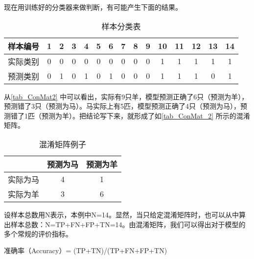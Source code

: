 现在用训练好的分类器来做判断，有可能产生下面的结果。

\begin{table}[ht]
\centering
\caption{样本分类表}\label{tab_ConMat2}
\begin{tabular}{|c|c|c|c|c|c|c|c|c|c|c|c|c|c|c|}
\hline
样本编号 & 1 & 2 & 3 & 4 & 5 & 6 & 7 & 8 & 9 & 10 & 11 & 12 & 13 & 14 \\
\hline
实际类别 & 0 & 0 & 0 & 0 & 0 & 0 & 0 & 0 & 0 & 1 & 1 & 1 & 1 & 1 \\
\hline
预测类别 & 0 & 1 & 0 & 1 & 0 & 1 & 0 & 0 & 0 & 1 & 1 & 1 & 0 & 1 \\
\hline
\end{tabular}
\end{table}

从\autoref{tab_ConMat2} 中可以看出，实际有9只羊，模型预测正确了6只（预测为羊），预测错了3只（预测为马）。马实际上有5匹，模型预测正确了4只（预测为马），预测错了1匹（预测为羊）。把结论写下来，就形成了如\autoref{tab_ConMat_2} 所示的混淆矩阵。
\begin{table}[ht]
\centering
\caption{混淆矩阵例子}\label{tab_ConMat_2}
\begin{tabular}{|c|c|c|}
\hline
 & 预测为马 & 预测为羊 \\
\hline
实际为马 & 4 & 1 \\
\hline
实际为羊 & 3 & 6 \\
\hline
\end{tabular}
\end{table}

设样本总数用N表示，本例中N=14。显然，当只给定混淆矩阵时，也可以从中算出样本总数：N=TP+FN+FP+TN=14。由混淆矩阵，我们可以得出对于模型的多个常规的评价指标。

准确率（Accuracy）= (TP+TN)/(TP+FN+FP+TN)